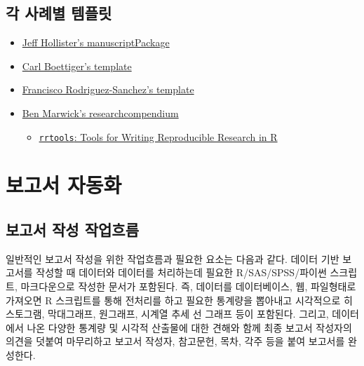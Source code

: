 \documentclass[
  letterpaper,
  chapter,a4paper,showtrims,openright,hidelinks]{oblivoir}
\providecommand{\tightlist}{%
  \setlength{\itemsep}{0pt}\setlength{\parskip}{0pt}}\usepackage{longtable,booktabs,array}
\begin{document}
\hypertarget{case-by-case-template}{%
\section{각 사례별 템플릿}\label{case-by-case-template}}

\begin{itemize}
\tightlist
\item
  \href{https://github.com/jhollist/manuscriptPackage}{Jeff Hollister's
  manuscriptPackage}
\item
  \href{https://github.com/cboettig/template}{Carl Boettiger's template}
\item
  \href{https://github.com/Pakillo/template}{Francisco
  Rodriguez-Sanchez's template}
\item
  \href{https://github.com/benmarwick/researchcompendium}{Ben Marwick's
  researchcompendium}

  \begin{itemize}
  \tightlist
  \item
    \href{https://github.com/benmarwick/rrtools}{\texttt{rrtools}: Tools
    for Writing Reproducible Research in R}
  \end{itemize}
\end{itemize}

\hypertarget{uxbcf4uxace0uxc11c-uxc790uxb3d9uxd654}{%
\chapter{보고서 자동화}\label{uxbcf4uxace0uxc11c-uxc790uxb3d9uxd654}}

\hypertarget{uxbcf4uxace0uxc11c-uxc791uxc131-uxc791uxc5c5uxd750uxb984}{%
\section{보고서 작성
작업흐름}\label{uxbcf4uxace0uxc11c-uxc791uxc131-uxc791uxc5c5uxd750uxb984}}

일반적인 보고서 작성을 위한 작업흐름과 필요한 요소는 다음과 같다. 데이터
기반 보고서를 작성할 때 데이터와 데이터를 처리하는데 필요한
R/SAS/SPSS/파이썬 스크립트, 마크다운으로 작성한 문서가 포함된다. 즉,
데이터를 데이터베이스, 웹, 파일형태로 가져오면 R 스크립트를 통해
전처리를 하고 필요한 통계량을 뽑아내고 시각적으로 히스토그램,
막대그래프, 원그래프, 시계열 추세 선 그래프 등이 포함된다. 그리고,
데이터에서 나온 다양한 통계량 및 시각적 산출물에 대한 견해와 함께 최종
보고서 작성자의 의견을 덧붙여 마무리하고 보고서 작성자, 참고문헌, 목차,
각주 등을 붙여 보고서를 완성한다.
\end{document}
